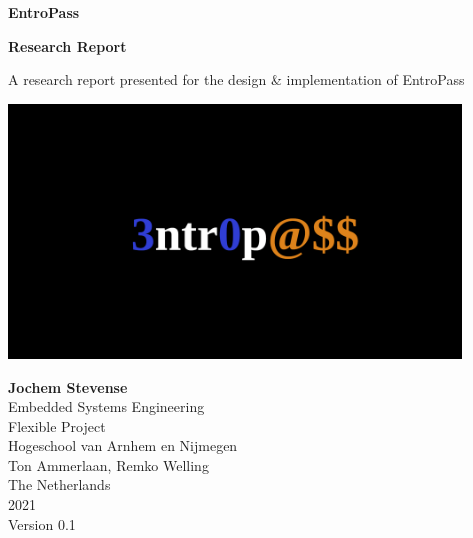 \documentclass[a4paper,12pt]{article}
\begin{document}
\begin{titlepage}
  \begin{center}
    \vspace*{1cm}

    \Huge
    \textbf{EntroPass}

    \vspace{0.5cm}
    \LARGE
    \textbf{Research Report}


    \Large
    A research report presented for the design \& implementation of EntroPass

    \vspace{0.8cm}

    \includegraphics[width=0.9\textwidth]{entropass}

  \end{center}
  \vfill  
  \vspace{1.5cm}

  \textbf{Jochem Stevense}\\
  \normalsize
  Embedded Systems Engineering\\
  Flexible Project\\
  Hogeschool van Arnhem en Nijmegen\\
  Ton Ammerlaan, Remko Welling\\
  The Netherlands\\
  2021\\
  Version 0.1
\end{titlepage}
\end{document}
